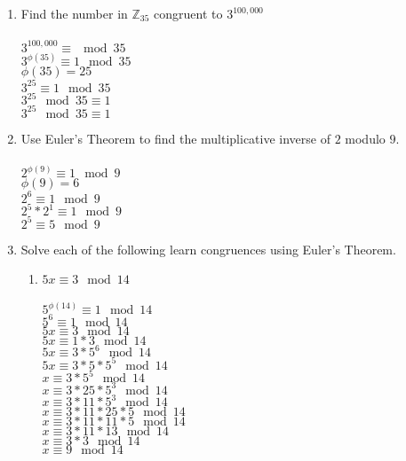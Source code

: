 \documentclass[]{article}
\begin{document}
\begin{enumerate}
    \item Find the number in $\mathbb{Z}_{35}$ congruent to $3^{100,000}$
    \\\\$3^{100,000} \equiv \mod 35$
    \\$3^{\phi(35)} \equiv 1 \mod 35 $
    \\$\phi(35)=25$
    \\$3^{25} \equiv 1 \mod 35 $
    \\$3^{25} \mod 35 \equiv 1$
    \\$3^{25} \mod 35 \equiv 1$

    \item Use Euler's Theorem to find the multiplicative inverse of $2$ modulo $9$.
    \\\\$2^{\phi(9)} \equiv 1 \mod 9$
    \\$\phi(9)=6$
    \\$2^6 \equiv 1 \mod 9$
    \\$2^5*2^1 \equiv 1 \mod 9$
    \\$2^5 \equiv 5 \mod 9$

    \item Solve each of the following learn congruences using Euler's Theorem.
    \begin{enumerate}
        \item $5x \equiv 3 \mod 14$
        \\\\$5^{\phi(14)} \equiv 1 \mod 14$
        \\$5^{6} \equiv 1 \mod 14$
        \\$5x \equiv 3 \mod 14$
        \\$5x \equiv 1*3 \mod 14$
        \\$5x \equiv 3 * 5^6 \mod 14$
        \\$5x \equiv 3 * 5 * 5^5 \mod 14$
        \\$x \equiv 3 *  5^5 \mod 14$
        \\$x \equiv 3 * 25 * 5^3 \mod 14$
        \\$x \equiv 3 * 11 * 5^3 \mod 14$
        \\$x \equiv 3 * 11 * 25*5 \mod 14$
        \\$x \equiv 3 * 11 * 11*5 \mod 14$
        \\$x \equiv 3 * 11 * 13 \mod 14$
        \\$x \equiv 3 * 3 \mod 14$
        \\$x \equiv 9 \mod 14$
        

\end{enumerate}
\end{enumerate}
\end{document}
